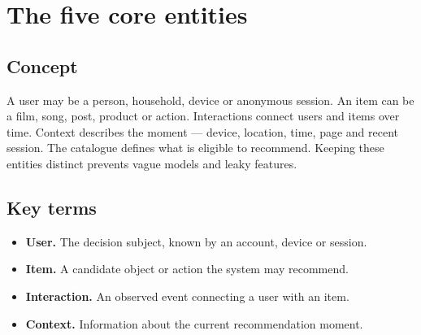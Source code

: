 \section{The five core entities}

\begin{abstract}
Every recommender starts with users, items, interactions, context and a catalogue.
\end{abstract}

\subsection{Concept}
A user may be a person, household, device or anonymous session. An item can be a film, song, post, product or action. Interactions connect users and items over time. Context describes the moment — device, location, time, page and recent session. The catalogue defines what is eligible to recommend. Keeping these entities distinct prevents vague models and leaky features.

\subsection{Key terms}
\begin{itemize}
\item \textbf{User.} The decision subject, known by an account, device or session.
\item \textbf{Item.} A candidate object or action the system may recommend.
\item \textbf{Interaction.} An observed event connecting a user with an item.
\item \textbf{Context.} Information about the current recommendation moment.
\end{itemize}
